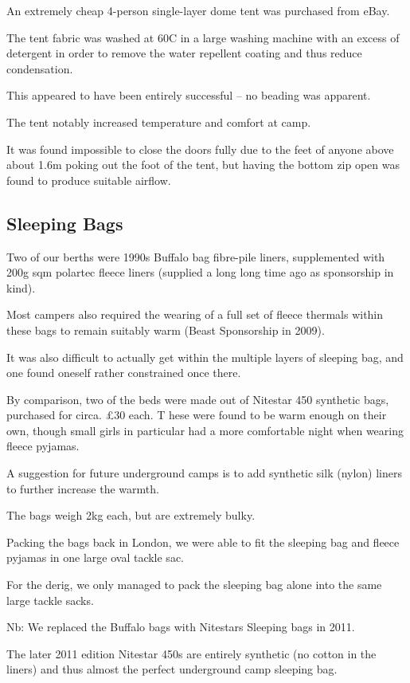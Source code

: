 An extremely cheap 4-person single-layer dome tent was purchased from
eBay.

The tent fabric was washed at 60C in a large washing machine with an
excess of detergent in order to remove the water repellent coating and
thus reduce condensation.

This appeared to have been entirely successful -- no beading was
apparent.

The tent notably increased temperature and comfort at camp.

It was found impossible to close the doors fully due to the feet of
anyone above about 1.6m poking out the foot of the tent, but having the
bottom zip open was found to produce suitable airflow.

\subsection{Sleeping Bags}\label{sleeping-bags}

Two of our berths were 1990s Buffalo bag fibre-pile liners, supplemented
with 200g sqm polartec fleece liners (supplied a long long time ago as
sponsorship in kind).

Most campers also required the wearing of a full set of fleece thermals
within these bags to remain suitably warm (Beast Sponsorship in 2009).

It was also difficult to actually get within the multiple layers of
sleeping bag, and one found oneself rather constrained once there.

By comparison, two of the beds were made out of Nitestar 450 synthetic
bags, purchased for circa. £30 each. T hese were found to be warm enough
on their own, though small girls in particular had a more comfortable
night when wearing fleece pyjamas.

A suggestion for future underground camps is to add synthetic silk
(nylon) liners to further increase the warmth.

The bags weigh 2kg each, but are extremely bulky.

Packing the bags back in London, we were able to fit the sleeping bag
and fleece pyjamas in one large oval tackle sac.

For the derig, we only managed to pack the sleeping bag alone into the
same large tackle sacks.

Nb: We replaced the Buffalo bags with Nitestars Sleeping bags in 2011.

The later 2011 edition Nitestar 450s are entirely synthetic (no cotton
in the liners) and thus almost the perfect underground camp sleeping
bag.

